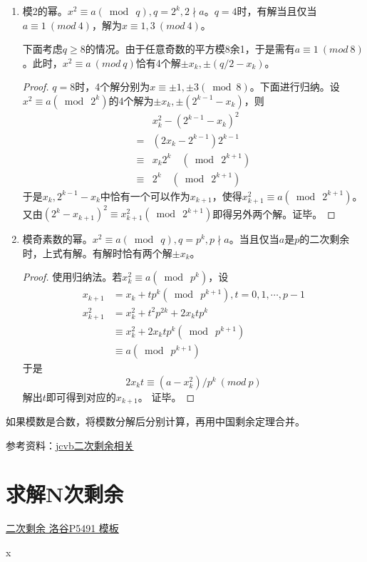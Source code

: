 \begin{enumerate}
\item {\heiti 模2的幂。}$x^{2} \equiv a(\bmod\ q), q=2^{k}, 2\nmid a$。$q=4$时，有解当且仅当$a\equiv 1\ (mod\ 4)$，解为$x\equiv 1,3\ (mod\ 4)$。

下面考虑$q\ge8$的情况。由于任意奇数的平方模$8$余1，于是需有$a\equiv 1\ (mod\ 8)$。此时，$x^2\equiv a\ (mod\ q)$恰有4个解$\pm x_{k}, \pm\left(q / 2-x_{k}\right)$。
\begin{proof}
$q=8$时，4个解分别为$x \equiv \pm 1, \pm 3(\bmod 8)$。下面进行归纳。设$x^{2} \equiv a\left(\bmod\ 2^{k}\right)$的4个解为$\pm x_{k}, \pm\left(2^{k-1}-x_{k}\right)$，则
$$
\begin{aligned} & x_{k}^{2}-\left(2^{k-1}-x_{k}\right)^{2} \\=&\left(2 x_{k}-2^{k-1}\right) 2^{k-1} \\ \equiv & x_{k} 2^{k} \quad\left(\bmod\ 2^{k+1}\right) \\ \equiv & 2^{k} \quad\left(\bmod\ 2^{k+1}\right) \end{aligned}
$$
于是$x_{k}, 2^{k-1}-x_{k}$中恰有一个可以作为$x_{k+1}$，使得$x_{k+1}^{2} \equiv a\left(\bmod\ 2^{k+1}\right)$。又由$\left(2^{k}-x_{k+1}\right)^{2} \equiv x_{k+1}^{2}\left(\bmod\ 2^{k+1}\right)$即得另外两个解。证毕。
\end{proof}

\item {\heiti 模奇素数的幂。}$x^{2} \equiv a(\bmod\ q), q=p^{k}, p \nmid a$。当且仅当$a$是$p$的二次剩余时，上式有解。有解时恰有两个解$\pm x_{k}$。
\begin{proof}
使用归纳法。若$x_{k}^{2} \equiv a\left(\bmod\ p^{k}\right)$，设
$$
\begin{aligned} x_{k+1} &=x_{k}+t p^{k}\left(\bmod\ p^{k+1}\right), t=0,1, \cdots, p-1 \\ x_{k+1}^{2} &=x_{k}^{2}+t^{2} p^{2 k}+2 x_{k} t p^{k} \\ & \equiv x_{k}^{2}+2 x_{k} t p^{k}\left(\bmod\ p^{k+1}\right) \\ & \equiv a\left(\bmod\ p^{k+1}\right) \end{aligned}
$$
于是
$$
2x_kt\equiv (a-x_k^2)/p^k\ (mod\ p)
$$
解出$t$即可得到对应的$x_{k+1}$。
证毕。
\end{proof}
\end{enumerate}

\vbox{}

{\heiti 如果模数是合数，将模数分解后分别计算，再用中国剩余定理合并。}

参考资料：\href{https://max.book118.com/html/2018/0525/168640677.shtm}{jcvb\quad 二次剩余相关}

\section{求解N次剩余}


\begin{problemset}
	\item \href{https://www.luogu.org/problem/P5491}{二次剩余 \quad 洛谷P5491 \quad 模板}
	\item x  
\end{problemset}